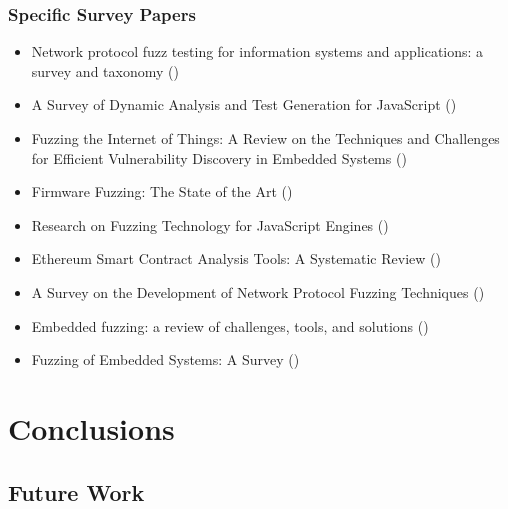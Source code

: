 \documentclass{article}
\begin{document}
\subsubsection{Specific Survey Papers}
\begin{itemize}
    \item    Network protocol fuzz testing for information systems and applications: a survey and taxonomy (\citeyear{Network})\cite{Network}
    \item    A Survey of Dynamic Analysis and Test Generation for JavaScript (\citeyear{JavaScript2})\cite{JavaScript2}
    \item    Fuzzing the Internet of Things: A Review on the Techniques and Challenges for Efficient Vulnerability Discovery in Embedded Systems (\citeyear{IoT})\cite{IoT}
    \item    Firmware Fuzzing: The State of the Art (\citeyear{Firmware})\cite{Firmware}
    \item    Research on Fuzzing Technology for JavaScript Engines (\citeyear{JavaScript})\cite{JavaScript}
    \item    Ethereum Smart Contract Analysis Tools: A Systematic Review (\citeyear{Ethereum})\cite{Ethereum}
    \item    A Survey on the Development of Network Protocol Fuzzing Techniques (\citeyear{Network2023})\cite{Network2023}
    \item    Embedded fuzzing: a review of challenges, tools, and solutions (\citeyear{Embedded2})\cite{Embedded2}
    \item    Fuzzing of Embedded Systems: A Survey (\citeyear{Embedded})\cite{Embedded}
\end{itemize}

\section{Conclusions}

\subsection{Future Work}

\pagebreak
{}
\printbibliography[]
\end{document}
